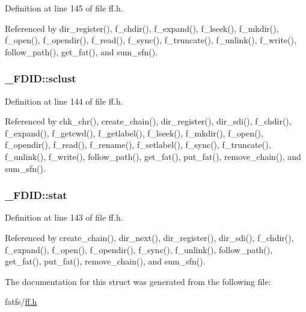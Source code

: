 Definition at line 145 of file ff.\+h.



Referenced by dir\+\_\+register(), f\+\_\+chdir(), f\+\_\+expand(), f\+\_\+lseek(), f\+\_\+mkdir(), f\+\_\+open(), f\+\_\+opendir(), f\+\_\+read(), f\+\_\+sync(), f\+\_\+truncate(), f\+\_\+unlink(), f\+\_\+write(), follow\+\_\+path(), get\+\_\+fat(), and sum\+\_\+sfn().

\subsubsection[{\texorpdfstring{sclust}{sclust}}]{ \+\_\+\+F\+D\+I\+D\+::sclust}\hypertarget{struct__FDID_ae2fbaaa31b5d12b333cb6d1ded099412}{}\label{struct__FDID_ae2fbaaa31b5d12b333cb6d1ded099412}


Definition at line 144 of file ff.\+h.



Referenced by chk\+\_\+chr(), create\+\_\+chain(), dir\+\_\+register(), dir\+\_\+sdi(), f\+\_\+chdir(), f\+\_\+expand(), f\+\_\+getcwd(), f\+\_\+getlabel(), f\+\_\+lseek(), f\+\_\+mkdir(), f\+\_\+open(), f\+\_\+opendir(), f\+\_\+read(), f\+\_\+rename(), f\+\_\+setlabel(), f\+\_\+sync(), f\+\_\+truncate(), f\+\_\+unlink(), f\+\_\+write(), follow\+\_\+path(), get\+\_\+fat(), put\+\_\+fat(), remove\+\_\+chain(), and sum\+\_\+sfn().

\subsubsection[{\texorpdfstring{stat}{stat}}]{ \+\_\+\+F\+D\+I\+D\+::stat}\hypertarget{struct__FDID_a1a2ff09f2ef172772f4e7312070be708}{}\label{struct__FDID_a1a2ff09f2ef172772f4e7312070be708}


Definition at line 143 of file ff.\+h.



Referenced by create\+\_\+chain(), dir\+\_\+next(), dir\+\_\+register(), dir\+\_\+sdi(), f\+\_\+chdir(), f\+\_\+expand(), f\+\_\+open(), f\+\_\+opendir(), f\+\_\+sync(), f\+\_\+unlink(), follow\+\_\+path(), get\+\_\+fat(), put\+\_\+fat(), remove\+\_\+chain(), and sum\+\_\+sfn().



The documentation for this struct was generated from the following file\+:\begin{DoxyCompactItemize}
\item 
fatfs/\hyperlink{ff_8h}{ff.\+h}\end{DoxyCompactItemize}
